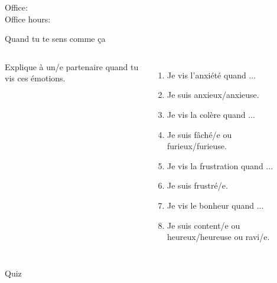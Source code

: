 \documentclass{beamer}
\subtitle[Émotions et verbes pronominaux]{Les émotions et plus de verbes pronominaux}
\begin{document}
  \begin{frame}
    \titlepage
    \tiny{Office: \\
          Office hours: }
  \end{frame}

  \begin{frame}{Quand tu te sens comme ça}
    \begin{columns}
        Explique à un/e partenaire quand tu vis  ces émotions. \\
        \begin{enumerate}
          \item Je vis \alert{l'anxiété} quand ...
          \item<3->[$\to$] Je suis anxieux/anxieuse.
          \item Je vis \alert{la colère} quand ...
          \item<4->[$\to$] Je suis fâché/e ou furieux/furieuse.
          \item Je vis \alert{la frustration} quand ...
          \item<5->[$\to$] Je suis frustré/e.
          \item Je vis \alert{le bonheur} quand ...
          \item<6->[$\to$] Je suis content/e ou heureux/heureuse ou ravi/e.
        \end{enumerate}
        \begin{minipage}[c][0.8\textheight]{\linewidth}
          \begin{center}
          \end{center}
        \end{minipage}
    \end{columns}
  \end{frame}

  \begin{frame}{}
    \begin{center}
      \Large Quiz
    \end{center}
  \end{frame}
\end{document}
